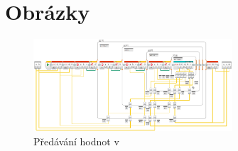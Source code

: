 \chapter{Obrázky}

\begin{figure}[h]
	\centering
	\includegraphics[angle=-90,origin=c,width=280px]{images/lego-soft_legolib_match_array_length.png}
	\caption[Předávání hodnot v \legoSW{}]{Předávání hodnot v \legoSW{}}
	\label{fig:lego-soft_legolib_match_array_length}
\end{figure}




